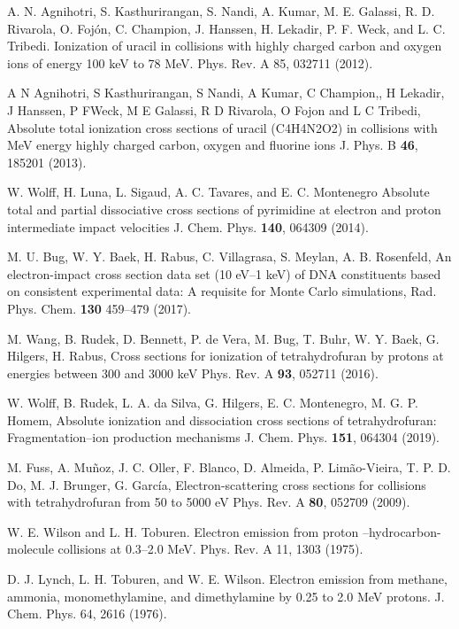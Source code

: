 \documentclass[preprint,12pt]{article}
\begin{document}
\begin{thebibliography}{99}
A. N. Agnihotri, S. Kasthurirangan, S. Nandi, A.
Kumar, M. E. Galassi, R. D. Rivarola, O. Foj\'{o}n, C. Champion, J. Hanssen,
H. Lekadir, P. F. Weck, and L. C. Tribedi. Ionization of uracil in
collisions with highly charged carbon and oxygen ions of energy 100 keV to
78 MeV. 
Phys. Rev. A 85, 032711 (2012).

A N Agnihotri, S Kasthurirangan, S Nandi, A Kumar, C Champion,, H Lekadir, 
J Hanssen, P FWeck, M E Galassi, R D Rivarola, O Fojon and L C Tribedi, 
Absolute total ionization cross sections of uracil (C4H4N2O2) in 
collisions with MeV energy highly charged carbon, oxygen and fluorine ions
J. Phys. B \textbf{46}, 185201 (2013).

W. Wolff, H. Luna, L. Sigaud, A. C. Tavares, and E. C. Montenegro
Absolute total and partial dissociative cross sections of pyrimidine
at electron and proton intermediate impact velocities
J. Chem. Phys. \textbf{140}, 064309 (2014).

M. U. Bug, W. Y. Baek, H. Rabus, C. Villagrasa, S. Meylan, A. B. Rosenfeld,
An electron-impact cross section data set (10 eV--1 keV) of DNA
constituents based on consistent experimental data: A requisite for 
Monte Carlo simulations,
Rad. Phys. Chem. \textbf{130} 459--479 (2017).

M. Wang, B. Rudek, D. Bennett, P. de Vera, M. Bug, T. Buhr, W. Y. Baek, 
G. Hilgers, H. Rabus, 
Cross sections for ionization of tetrahydrofuran by protons at energies 
between 300 and 3000 keV
Phys. Rev. A \textbf{93}, 052711 (2016).

W. Wolff, B. Rudek, L. A. da Silva, G. Hilgers, E. C. Montenegro, 
M. G. P. Homem,
Absolute ionization and dissociation cross sections of tetrahydrofuran:
Fragmentation--ion production mechanisms
J. Chem. Phys. \textbf{151}, 064304 (2019).

M. Fuss, A. Muñoz, J. C. Oller, F. Blanco, D. Almeida, P. Limão-Vieira, 
T. P. D. Do, M. J. Brunger, G. García,
Electron-scattering cross sections for collisions with tetrahydrofuran 
from 50 to 5000 eV
Phys. Rev. A \textbf{80}, 052709 (2009).


W. E. Wilson and L. H. Toburen. Electron emission from
proton --hydrocarbon-molecule collisions at 0.3--2.0 MeV. 
Phys. Rev. A 11, 1303 (1975).

D. J. Lynch, L. H. Toburen, and W. E. Wilson. Electron
emission from methane, ammonia, monomethylamine, and dimethylamine by 0.25
to 2.0 MeV protons. 
J. Chem. Phys. 64, 2616 (1976).


\end{thebibliography}
\end{document}
